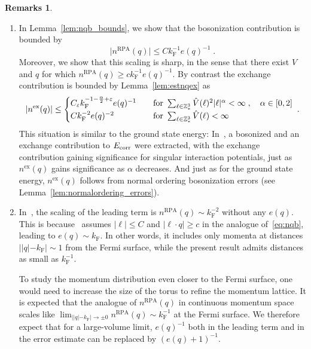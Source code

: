 \documentclass[12pt,a4paper]{article}
\numberwithin{equation}{section}
\newcommand{\1}{\mathbb{I}}
\newcommand{\ex}{\mathrm{ex}}
\newcommand{\F}{\mathrm{F}}
\newcommand{\RPA}{\mathrm{RPA}}
\newcommand{\Z}{\mathbb{Z}}
\theoremstyle{plain}
\theoremstyle{definition}
\newtheorem*{remarks}{Remarks}
\theoremstyle{remark}
\theoremstyle{plain}
\theoremstyle{definition}
\theoremstyle{remark}
\begin{document}
\begin{remarks}
\begin{enumerate}

\item In Lemma~\ref{lem:nqb_bounds}, we show that the bosonization contribution is bounded by
\begin{equation}
	\lvert n^{\RPA}(q)\rvert \le C k_{\F}^{-1} e(q)^{-1} \;.
\end{equation}
Moreover, we show that this scaling is sharp, in the sense that there exist $ V $ and $ q $ for which $ n^{\RPA}(q) \ge c k_{\F}^{-1} e(q)^{-1} $. \todo{Make sure that $ n^{\RPA}(q) \ge c k_{\F}^{-1} e(q)^{-1} $ is true.}
By contrast the exchange contribution is bounded by Lemma~\ref{lem:estnqex} as
\begin{equation}
	\lvert n^{\ex}(q)\rvert
	\le \begin{cases}
		C_\varepsilon k_{\F}^{-1-\frac{\alpha}{2} + \varepsilon } e(q)^{-1} \quad&\textnormal{for } \sum_{\ell \in \Z^3_*} \hat{V}(\ell)^2 |\ell|^\alpha < \infty \;, \quad \alpha \in [0,2] \\
		C k_{\F}^{-2} e(q)^{-2} \quad&\textnormal{for } \sum_{\ell \in \Z^3_*} \hat{V}(\ell) < \infty
	\end{cases} \;.
\end{equation}
This situation is similar to the ground state energy: In~\cite{CHN23,CHN24}, a bosonized and an exchange contribution to $ E_{\textnormal{corr}} $ were extracted, with the exchange contribution gaining significance for singular interaction potentials, just as $ n^{\ex}(q) $ gains significance as $ \alpha $ decreases. And just as for the ground state energy, $ n^{\ex}(q) $ follows from normal ordering bosonization errors (see Lemma~\eqref{lem:normalordering_errors}).


\item In~\cite{BL25}, the scaling of the leading term is $ n^{\RPA}(q) \sim k_{\F}^{-2} $ without any $ e(q) $. This is because~\cite{BL25} assumes $ |\ell| \le C $ and $ |\ell \cdot q| \ge c $ in the analogue of~\eqref{eq:nqb}, leading to $ e(q) \sim k_{\F} $. In other words, it includes only momenta at distances $ ||q|-k_{\F}| \sim 1 $ from the Fermi surface, while the present result admits distances as small as $ k_{\F}^{-1} $.

To study the momentum distribution even closer to the Fermi surface, one would need to increase the size of the torus to refine the momentum lattice. It is expected \cite{DV60} that the analogue of $ n^{\RPA}(q) $ in continuous momentum space scales like $ \lim_{||q|-k_{\F}| \to \pm 0} n^{\RPA}(q) \sim k_{\F}^{-1} $ at the Fermi surface. We therefore expect that for a large-volume limit, $ e(q)^{-1} $ both in the leading term and in the error estimate can be replaced by $ (e(q)+1)^{-1} $.



\end{enumerate}
\end{remarks}
\end{document}
